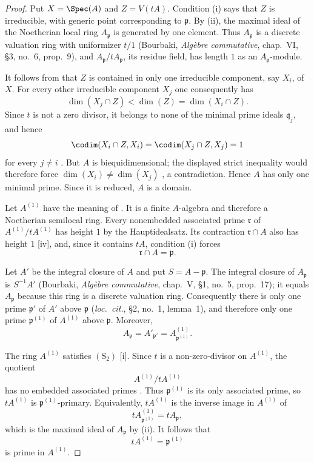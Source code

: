 \begin{proof}
Put $X=\Spec(A)$ and $Z=V(tA)$.  Condition {\rm(i)} says that
$Z$ is irreducible, with generic point corresponding to
$\mathfrak p$.  By {\rm(ii)}, the maximal ideal of the
Noetherian local ring $A_{\mathfrak p}$ is generated by one
element.  Thus $A_{\mathfrak p}$ is a discrete valuation ring
with uniformizer $t/1$ (Bourbaki, \emph{Alg\`ebre commutative},
chap.~VI, \S3, no.~6, prop.~9), and
$A_{\mathfrak p}/tA_{\mathfrak p}$, its residue field, has length
$1$ as an $A_{\mathfrak p}$-module.

It follows from  that $Z$ is contained in only one
irreducible component, say $X_i$, of $X$.  For every other
irreducible component $X_j$ one consequently has
\[
  \dim(X_j\cap Z)<\dim(Z)=\dim(X_i\cap Z).
\]
Since $t$ is not a zero divisor, it belongs to none of the
minimal prime ideals $\mathfrak q_j$, and hence
\[
  \codim(X_i\cap Z,X_i)
  =\codim(X_j\cap Z,X_j)=1
\]
for every $j\ne i$ .  But $A$ is
biequidimensional; the displayed strict inequality would
therefore force $\dim(X_i)\ne\dim(X_j)$
, a contradiction.  Hence $A$ has only one
minimal prime.  Since it is reduced, $A$ is a domain.

Let $A^{(1)}$ have the meaning of .  It is a
finite $A$-algebra and therefore a Noetherian semilocal ring.
Every nonembedded associated prime $\mathfrak r$ of
$A^{(1)}/tA^{(1)}$ has height $1$ by the Hauptidealsatz.  Its
contraction $\mathfrak r\cap A$ also has height $1$
[iv], and, since it contains $tA$, condition
{\rm(i)} forces
\[
  \mathfrak r\cap A=\mathfrak p.
\]

Let $A'$ be the integral closure of $A$ and put
$S=A-\mathfrak p$.  The integral closure of $A_{\mathfrak p}$ is
$S^{-1}A'$ (Bourbaki, \emph{Alg\`ebre commutative}, chap.~V,
\S1, no.~5, prop.~17); it equals $A_{\mathfrak p}$ because this
ring is a discrete valuation ring.  Consequently there is only
one prime $\mathfrak p'$ of $A'$ above $\mathfrak p$
(\emph{loc.\ cit.}, \S2, no.~1, lemma~1), and therefore only one
prime $\mathfrak p^{(1)}$ of $A^{(1)}$ above $\mathfrak p$.
Moreover,
\[
  A_{\mathfrak p}
  =A'_{\mathfrak p'}
  =A^{(1)}_{\mathfrak p^{(1)}}.
\]


The ring $A^{(1)}$ satisfies $(\mathrm S_2)$
[i].  Since $t$ is a non-zero-divisor on
$A^{(1)}$, the quotient
\[
  A^{(1)}/tA^{(1)}
\]
has no embedded associated primes .  Thus
$\mathfrak p^{(1)}$ is its only associated prime, so
$tA^{(1)}$ is $\mathfrak p^{(1)}$-primary.  Equivalently,
$tA^{(1)}$ is the inverse image in $A^{(1)}$ of
\[
  tA^{(1)}_{\mathfrak p^{(1)}}=tA_{\mathfrak p},
\]
which is the maximal ideal of $A_{\mathfrak p}$ by {\rm(ii)}.
It follows that
\[
  tA^{(1)}=\mathfrak p^{(1)}
\]
is prime in $A^{(1)}$.


\end{proof}
